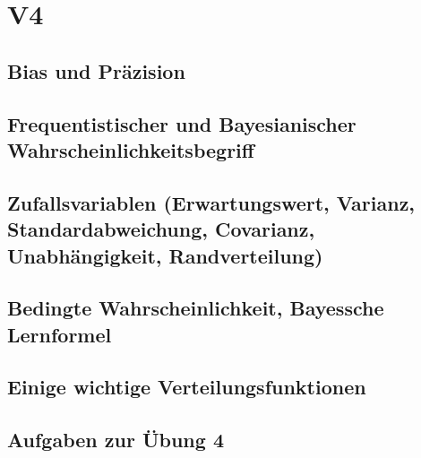 \section{V4}
\subsection{Bias und Präzision}

\subsection{Frequentistischer und Bayesianischer Wahrscheinlichkeitsbegriff}

\subsection{Zufallsvariablen (Erwartungswert, Varianz, Standardabweichung, Covarianz, Unabhängigkeit, Randverteilung)}

\subsection{Bedingte Wahrscheinlichkeit, Bayessche Lernformel}

\subsection{Einige wichtige Verteilungsfunktionen}

\subsection{Aufgaben zur Übung 4}